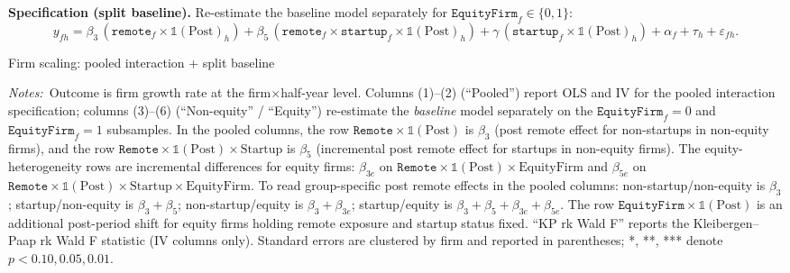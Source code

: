 \documentclass{article}
\newcommand{\cleanedresultsdir}{../../results/cleaned/tex}
\newcommand{\TableInput}[2][\linewidth]{}
\newcommand{\FloatNote}[1]{%
  \begingroup
    \captionsetup{style=noteflush}%
    \caption*{\textit{Notes:}~#1}%
  \endgroup
}
\begin{document}
\medskip
\noindent \textbf{Specification (split baseline).}
Re-estimate the baseline model separately for $\texttt{EquityFirm}_f\in\{0,1\}$:
\begin{equation*}
  y_{fh} =
  \beta_3\,(\texttt{remote}_f\times \mathds{1}(\text{Post})_h)
  + \beta_5\,(\texttt{remote}_f\times \texttt{startup}_f\times \mathds{1}(\text{Post})_h)
  + \gamma\,(\texttt{startup}_f\times \mathds{1}(\text{Post})_h)
  + \alpha_f + \tau_h + \varepsilon_{fh}.
\end{equation*}
\begin{table}[H]\centering
  \caption{Firm scaling: pooled interaction + split baseline}
  \TableInput{\cleanedresultsdir/firm_scaling_llm_equity_heterogeneity.tex}
  \FloatNote{Outcome is firm growth rate at the firm$\times$half-year level. Columns (1)--(2) (``Pooled'') report OLS and IV for the pooled interaction specification; columns (3)--(6) (``Non-equity'' / ``Equity'') re-estimate the \emph{baseline} model separately on the $\texttt{EquityFirm}_f=0$ and $\texttt{EquityFirm}_f=1$ subsamples. In the pooled columns, the row $\texttt{Remote}\times\mathds{1}(\text{Post})$ is $\beta_3$ (post remote effect for non-startups in non-equity firms), and the row $\texttt{Remote}\times\mathds{1}(\text{Post})\times\text{Startup}$ is $\beta_5$ (incremental post remote effect for startups in non-equity firms). The equity-heterogeneity rows are incremental differences for equity firms: $\beta_{3e}$ on $\texttt{Remote}\times\mathds{1}(\text{Post})\times\text{EquityFirm}$ and $\beta_{5e}$ on $\texttt{Remote}\times\mathds{1}(\text{Post})\times\text{Startup}\times\text{EquityFirm}$. To read group-specific post remote effects in the pooled columns: non-startup/non-equity is $\beta_3$; startup/non-equity is $\beta_3+\beta_5$; non-startup/equity is $\beta_3+\beta_{3e}$; startup/equity is $\beta_3+\beta_5+\beta_{3e}+\beta_{5e}$. The row $\texttt{EquityFirm}\times\mathds{1}(\text{Post})$ is an additional post-period shift for equity firms holding remote exposure and startup status fixed. ``KP rk Wald F'' reports the Kleibergen--Paap rk Wald F statistic (IV columns only). Standard errors are clustered by firm and reported in parentheses; *, **, *** denote $p<0.10, 0.05, 0.01$.}
\end{table}
\end{document}

